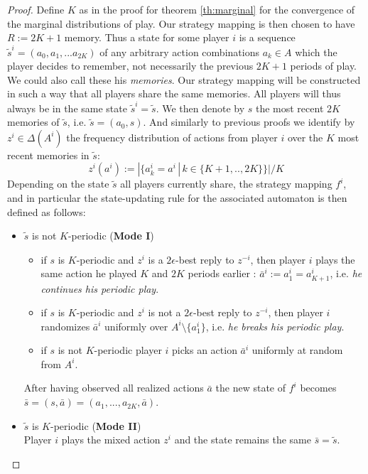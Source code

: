 \documentclass[a4paper]{article}
\theoremstyle{plain}
\theoremstyle{remark}
\begin{document}
\begin{proof}
	Define $K$ as in the proof for theorem \ref{th:marginal} for the convergence of the marginal
	distributions of play. Our strategy mapping is then chosen to have $R := 2K + 1$ memory.
	Thus a state for some player $i$ is a sequence $\tilde{s}^i = (a_0, a_1, ... a_{2K})$ of any arbitrary action combinations $a_k \in A$
	which the player decides to remember, not necessarily the previous $2K+1$ periods of play. We could also call these his \emph{memories}.
    Our strategy mapping will be constructed in such a way that all players share the same memories. All players will thus
    always be in the same state $\tilde{s}^i = \tilde{s}$.
	We then denote by $s$ the most recent $2K$ memories of $\tilde{s}$, i.e. $\tilde{s} = (a_0, s)$.
	And similarly to previous proofs we identify by $z^i \in \Delta(A^i)$ the frequency distribution of actions 
    from player $i$ over the $K$ most recent memories in $\tilde{s}$:
    \[
        z^i(a^i) := | \{ a^i_k = a^i \, | \, k \in \{K+1, .. , 2K\} \} | / K
    \]
	Depending on the state $\tilde{s}$ all players currently share, the strategy mapping $f^i$, and 
	in particular the state-updating rule for the associated automaton is then defined as follows:
	
	\begin{itemize}
		\item $\tilde{s}$ is not $K$-periodic ({\bf Mode I})
		\begin{itemize}
			\item	if $s$ is $K$-periodic and $z^i$ is a $2\epsilon$-best reply to $z^{-i}$, 
			then player $i$ plays the same action he played $K$ and $2K$ periods earlier : $\bar{a}^i := a^i_1 = a^i_{K+1}$,
			i.e. \emph{he continues his periodic play}.
			
			\item if $s$ is $K$-periodic and $z^i$ is not a $2\epsilon$-best reply to $z^{-i}$,
			then player $i$ randomizes $\bar{a}^i$ uniformly over $A^i \setminus \{a^i_1\}$,
			i.e. \emph{he breaks his periodic play}.
			
			\item if $s$ is not $K$-periodic player $i$ picks an action $\bar{a}^i$ uniformly at random from $A^i$.
		\end{itemize}
		After having observed all realized actions $\bar{a}$ the new state of $f^i$ becomes
		$\bar{s} = (s, \bar{a}) = (a_1, ..., a_{2K}, \bar{a})$.
			
		\item $\tilde{s}$ is $K$-periodic ({\bf Mode II})\\
			Player $i$ plays the mixed action $z^i$ and the state remains the same $\bar{s} = \tilde{s}$.
		

\end{itemize}
\end{proof}
\end{document}
